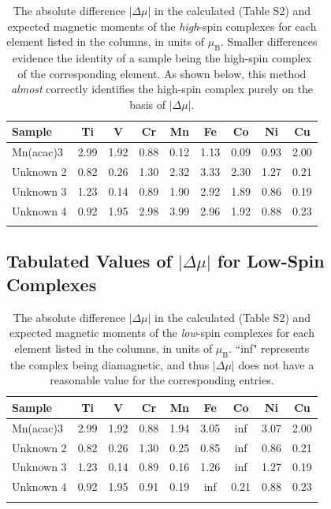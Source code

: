 \documentclass[journal = jacsat, manuscript = suppinfo]{achemso}
\newcommand{\acac}[1]{\ce{#1(acac)3}}
\begin{document}
\begin{table}[H]
\begin{tabular}{lcccccccc}
\toprule
Sample &        Ti &         V &        Cr &        Mn &        Fe &        Co &        Ni &        Cu \\
\midrule
Mn(acac)3 &  2.99 &  1.92 &  0.88 &  0.12 &  1.13 &  0.09 &  0.93 &  2.00 \\
Unknown 2 &  0.82 &  0.26 &  1.30 &  2.32 &  3.33 &  2.30 &  1.27 &  0.21 \\
Unknown 3 &  1.23 &  0.14 &  0.89 &  1.90 &  2.92 &  1.89 &  0.86 &  0.19 \\
Unknown 4 &  0.92 &  1.95 &  2.98 &  3.99 &  2.96 &  1.92 &  0.88 &  0.23 \\
\bottomrule

\caption{The absolute difference $|\Delta\mu|$ in the calculated (Table S2) and
	expected magnetic moments of the \emph{high}-spin complexes for each
	element listed in the columns, in units of $\mu_\text{B}$. Smaller
	differences evidence the identity of a sample being the high-spin complex of the
	corresponding element. As shown below, this method \emph{almost} correctly
	identifies the high-spin complex \acac{Mn} purely on the basis of
	$|\Delta\mu|$.}

\end{tabular}
\end{table}

\subsection{Tabulated Values of $|\Delta\mu|$ for Low-Spin Complexes}

\begin{table}[H]
\begin{tabular}{lcccccccc}
\toprule
Sample &        Ti &         V &        Cr &        Mn &        Fe &        Co &        Ni &        Cu \\
\midrule
Mn(acac)3 &  2.99 &  1.92 &  0.88 &  1.94 &  3.05 &       inf &  3.07 &  2.00 \\
Unknown 2 &  0.82 &  0.26 &  1.30 &  0.25 &  0.85 &       inf &  0.86 &  0.21 \\
Unknown 3 &  1.23 &  0.14 &  0.89 &  0.16 &  1.26 &       inf &  1.27 &  0.19 \\
Unknown 4 &  0.92 &  1.95 &  0.91 &  0.19 &   inf &  0.21     &  0.88 &  0.23 \\
\bottomrule

\caption{The absolute difference $|\Delta\mu|$ in the calculated (Table S2) and
	expected magnetic moments of the \emph{low}-spin complexes for each
	element listed in the columns, in units of $\mu_\text{B}$. ``inf"
	represents the complex being diamagnetic, and thus $|\Delta\mu|$ does
	not have a reasonable value for the corresponding entries.}

\end{tabular}
\end{table}
\end{document}
